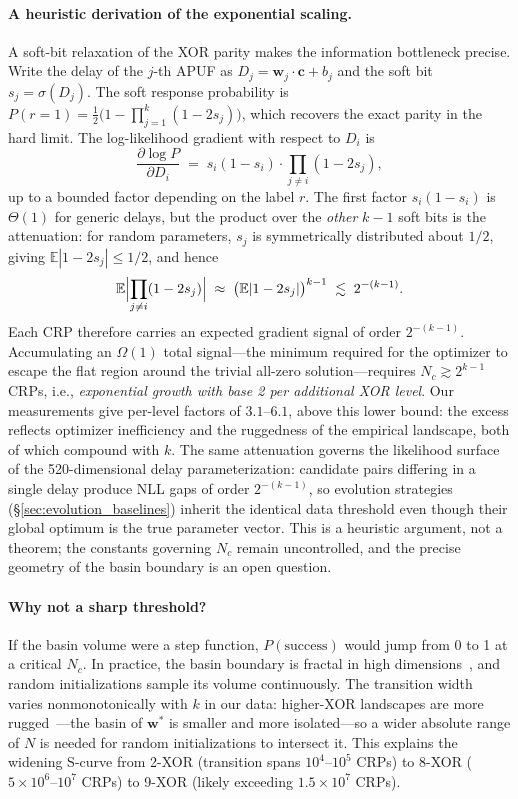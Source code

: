 \paragraph{A heuristic derivation of the exponential scaling.}
A soft-bit relaxation of the XOR parity makes the information bottleneck
precise.  Write the delay of the $j$-th APUF as
$D_j = \mathbf{w}_j \cdot \mathbf{c} + b_j$ and the soft bit
$s_j = \sigma(D_j)$.  The soft response probability is
$P(r{=}1) = \frac{1}{2}\bigl(1 - \prod_{j=1}^{k}(1-2s_j)\bigr)$, which
recovers the exact parity in the hard limit.  The log-likelihood gradient
with respect to $D_i$ is
\[
\frac{\partial \log P}{\partial D_i} \;=\;
s_i(1-s_i) \cdot \prod_{j \neq i}(1-2s_j),
\]
up to a bounded factor depending on the label $r$.  The first factor
$s_i(1-s_i)$ is $\Theta(1)$ for generic delays, but the product over the
\emph{other} $k-1$ soft bits is the attenuation: for random parameters,
$s_j$ is symmetrically distributed about $1/2$, giving
$\mathbb{E}|1-2s_j| \leq 1/2$, and hence
\[
\mathbb{E}\Bigl|\prod_{j \neq i}(1-2s_j)\Bigr|
\;\approx\; \bigl(\mathbb{E}|1-2s_j|\bigr)^{k-1}
\;\lesssim\; 2^{-(k-1)}.
\]
Each CRP therefore carries an expected gradient signal of order
$2^{-(k-1)}$.  Accumulating an $\Omega(1)$
total signal---the minimum required for the optimizer to escape the flat
region around the trivial all-zero solution---requires
$N_c \gtrsim 2^{k-1}$ CRPs, i.e., \emph{exponential growth with base 2 per
additional XOR level}.  Our measurements give per-level factors of
$3.1$--$6.1$, above this lower bound: the excess reflects optimizer
inefficiency and the ruggedness of the empirical landscape, both of which
compound with $k$.  The same attenuation governs the likelihood surface of
the 520-dimensional delay parameterization: candidate pairs differing in a
single delay produce NLL gaps of order $2^{-(k-1)}$, so evolution strategies
(\S\ref{sec:evolution_baselines}) inherit the identical data threshold even
though their global optimum is the true parameter vector.  This is a
heuristic argument, not a theorem; the constants governing
$N_c$ remain uncontrolled, and the precise geometry of the basin boundary
is an open question.

\paragraph{Why not a sharp threshold?}
If the basin volume were a step function, $P(\text{success})$ would jump
from 0 to 1 at a critical $N_c$.  In practice, the basin boundary is fractal
in high dimensions~\cite{choromanska2015loss}, and random initializations
sample its volume continuously.  The transition width varies
nonmonotonically with $k$ in our data: higher-XOR landscapes are more
rugged~\cite{dauphin2014identifying}---the basin of $\mathbf{w}^*$ is smaller
and more isolated---so a wider absolute range of $N$ is needed for random
initializations to intersect it.  This explains the widening S-curve from
2-XOR (transition spans $10^4$--$10^5$ CRPs) to 8-XOR
($5\times10^6$--$10^7$ CRPs) to 9-XOR (likely exceeding
$1.5\times10^7$ CRPs).

